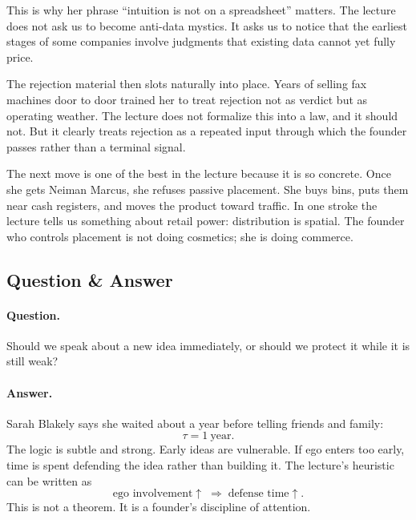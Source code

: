 This is why her phrase ``intuition is not on a spreadsheet'' matters. The lecture does not ask us to become anti-data mystics. It asks us to notice that the earliest stages of some companies involve judgments that existing data cannot yet fully price.

The rejection material then slots naturally into place. Years of selling fax machines door to door trained her to treat rejection not as verdict but as operating weather. The lecture does not formalize this into a law, and it should not. But it clearly treats rejection as a repeated input through which the founder passes rather than a terminal signal.

The next move is one of the best in the lecture because it is so concrete. Once she gets Neiman Marcus, she refuses passive placement. She buys bins, puts them near cash registers, and moves the product toward traffic. In one stroke the lecture tells us something about retail power: distribution is spatial. The founder who controls placement is not doing cosmetics; she is doing commerce.

\subsection{Question \& Answer}

\paragraph{Question.} Should we speak about a new idea immediately, or should we protect it while it is still weak?

\paragraph{Answer.} Sarah Blakely says she waited about a year before telling friends and family:
\begin{equation}
\tau = 1\ \text{year}.
\end{equation}
The logic is subtle and strong. Early ideas are vulnerable. If ego enters too early, time is spent defending the idea rather than building it. The lecture's heuristic can be written as
\begin{equation}
\text{ego involvement} \uparrow \;\Rightarrow\; \text{defense time} \uparrow.
\end{equation}
This is not a theorem. It is a founder's discipline of attention.

